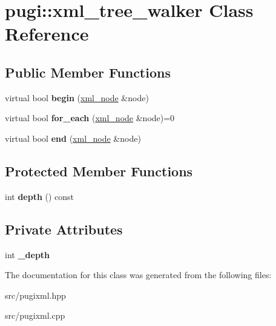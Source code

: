\hypertarget{classpugi_1_1xml__tree__walker}{}\section{pugi\+:\+:xml\+\_\+tree\+\_\+walker Class Reference}
\label{classpugi_1_1xml__tree__walker}
\subsection*{Public Member Functions}
\begin{DoxyCompactItemize}
\item 
\mbox{\label{classpugi_1_1xml__tree__walker_a831cc2fc61a47e23673c85efc41bc7a2}} 
virtual bool {\bfseries begin} (\hyperlink{classpugi_1_1xml__node}{xml\+\_\+node} \&node)
\item 
\mbox{\label{classpugi_1_1xml__tree__walker_a309363c9d17ef3fc8cacc6f71fcbea88}} 
virtual bool {\bfseries for\+\_\+each} (\hyperlink{classpugi_1_1xml__node}{xml\+\_\+node} \&node)=0
\item 
\mbox{\label{classpugi_1_1xml__tree__walker_a24e6ffd4a8351e2ee486440b6f784091}} 
virtual bool {\bfseries end} (\hyperlink{classpugi_1_1xml__node}{xml\+\_\+node} \&node)
\end{DoxyCompactItemize}
\subsection*{Protected Member Functions}
\begin{DoxyCompactItemize}
\item 
\mbox{\label{classpugi_1_1xml__tree__walker_ab7dc9c05507be13daa2f8cce24864913}} 
int {\bfseries depth} () const
\end{DoxyCompactItemize}
\subsection*{Private Attributes}
\begin{DoxyCompactItemize}
\item 
\mbox{\label{classpugi_1_1xml__tree__walker_a6726785913628e9388553961bd5feb32}} 
int {\bfseries \+\_\+depth}
\end{DoxyCompactItemize}


The documentation for this class was generated from the following files\+:\begin{DoxyCompactItemize}
\item 
src/pugixml.\+hpp\item 
src/pugixml.\+cpp\end{DoxyCompactItemize}
